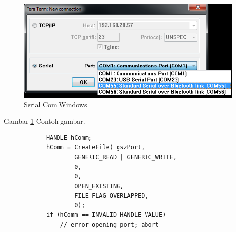 	\begin{figure}[ht]
		\centerline{\includegraphics[width=1\textwidth]{figures/seria.png}}
		\caption{Serial Com Windows}
		\label{seria}
	\end{figure}
	Gambar \ref{seria} Contoh gambar.
		\begin{verbatim}
			HANDLE hComm;
			hComm = CreateFile( gszPort,  
                    GENERIC_READ | GENERIC_WRITE, 
                    0, 
                    0, 
                    OPEN_EXISTING,
                    FILE_FLAG_OVERLAPPED,
                    0);
			if (hComm == INVALID_HANDLE_VALUE)
				// error opening port; abort
		\end{verbatim}
